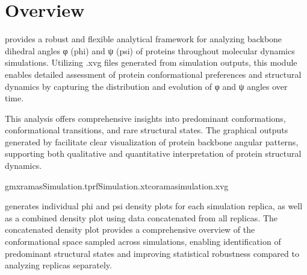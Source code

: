 \documentclass[a4paper,10pt,english]{sphinxmanual}
\begin{document}
\section{Overview}
\label{\detokenize{PhiPsi:overview}}
\sphinxAtStartPar
{} provides a robust and flexible analytical framework for analyzing backbone dihedral angles φ (phi) and ψ (psi) of proteins throughout molecular dynamics simulations. Utilizing .xvg files generated from simulation outputs, this module enables detailed assessment of protein conformational preferences and structural dynamics by capturing the distribution and evolution of φ and ψ angles over time.

\sphinxAtStartPar
This analysis offers comprehensive insights into predominant conformations, conformational transitions, and rare structural states. The graphical outputs generated by  facilitate clear visualization of protein backbone angular patterns, supporting both qualitative and quantitative interpretation of protein structural dynamics.

\sphinxAtStartPar
{}

\begin{sphinxVerbatim}[commandchars=\\\{\}]
gmxrama\PYGZhy{}sSimulation.tpr\PYGZhy{}fSimulation.xtc\PYGZhy{}orama\PYGZus{}simulation.xvg
\end{sphinxVerbatim}

\sphinxAtStartPar
{}  generates individual phi and psi density plots for each simulation replica, as well as a combined density plot using data concatenated from all replicas. The concatenated density plot provides a comprehensive overview of the conformational space sampled across simulations, enabling identification of predominant structural states and improving statistical robustness compared to analyzing replicas separately.

\begin{sphinxVerbatim}[commandchars=\\\{\}]
   
\end{sphinxVerbatim}
\end{document}
